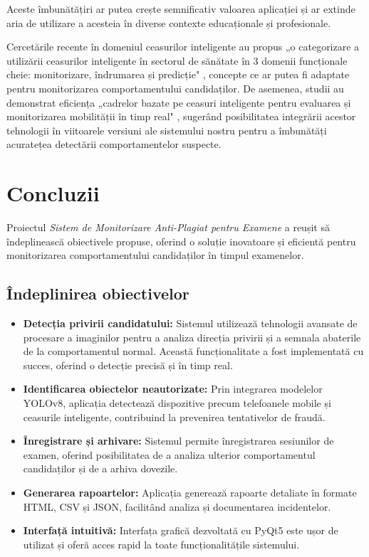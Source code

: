\documentclass[12pt,a4paper]{article}
\begin{document}
Aceste îmbunătățiri ar putea crește semnificativ valoarea aplicației și ar extinde aria de utilizare a acesteia în diverse contexte educaționale și profesionale.

Cercetările recente în domeniul ceasurilor inteligente au propus „o categorizare a utilizării ceasurilor 
inteligente în sectorul de sănătate în 3 domenii funcționale cheie: monitorizare, îndrumarea și 
predicție" \cite{smartwatch_framework}, concepte ce ar putea fi adaptate pentru monitorizarea 
comportamentului candidaților. De asemenea, studii au demonstrat eficiența „cadrelor bazate pe ceasuri 
inteligente pentru evaluarea și monitorizarea mobilității în timp real" \cite{smartwatch_monitoring}, 
sugerând posibilitatea integrării acestor tehnologii în viitoarele versiuni ale sistemului nostru pentru 
a îmbunătăți acuratețea detectării comportamentelor suspecte.

\section{Concluzii}

Proiectul \textit{Sistem de Monitorizare Anti-Plagiat pentru Examene} a reușit să îndeplinească obiectivele propuse, oferind o soluție inovatoare și eficientă pentru monitorizarea comportamentului candidaților în timpul examenelor. 

\subsection{Îndeplinirea obiectivelor}

\begin{itemize}
    \item \textbf{Detecția privirii candidatului:} Sistemul utilizează tehnologii avansate de procesare a imaginilor pentru a analiza direcția privirii și a semnala abaterile de la comportamentul normal. Această funcționalitate a fost implementată cu succes, oferind o detecție precisă și în timp real.
    
    \item \textbf{Identificarea obiectelor neautorizate:} Prin integrarea modelelor YOLOv8, aplicația detectează dispozitive precum telefoanele mobile și ceasurile inteligente, contribuind la prevenirea tentativelor de fraudă.
    
    \item \textbf{Înregistrare și arhivare:} Sistemul permite înregistrarea sesiunilor de examen, oferind posibilitatea de a analiza ulterior comportamentul candidaților și de a arhiva dovezile.
    
    \item \textbf{Generarea rapoartelor:} Aplicația generează rapoarte detaliate în formate HTML, CSV și JSON, facilitând analiza și documentarea incidentelor.
    
    \item \textbf{Interfață intuitivă:} Interfața grafică dezvoltată cu PyQt5 este ușor de utilizat și oferă acces rapid la toate funcționalitățile sistemului.
\end{itemize}
\end{document}

